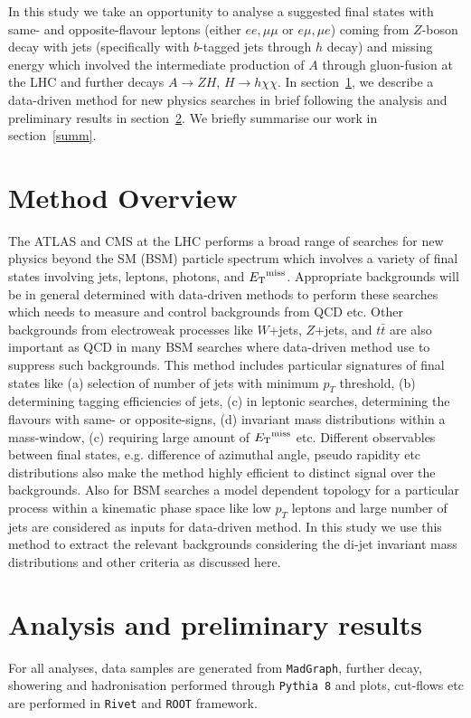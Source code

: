 \documentclass[a4paper]{jpconf}
\begin{document}
In this study we take an opportunity to analyse a suggested final states with same- and opposite-flavour leptons (either $ee, \mu\mu$
or $e\mu, \mu e$) coming from $Z$-boson decay with jets (specifically with $b$-tagged jets through $h$ decay) and missing energy 
which involved the intermediate production of $A$ through gluon-fusion at the LHC and further decays 
$A \to Z H$, $H \to h \chi\chi$. In section~\ref{method}, we describe a data-driven method for new physics searches in brief following
the analysis and preliminary results in section~\ref{analysis}. We briefly summarise our work in section~\ref{summ}. 

\section{Method Overview}
\label{method}
The ATLAS and CMS at the LHC performs a broad range of searches for new physics beyond the SM (BSM) particle spectrum which
involves a variety of final states involving jets, leptons, photons, and ${E_{\rm T}}^{\rm {miss}}$. Appropriate backgrounds will be in 
general determined with data-driven methods to perform these searches which needs to measure and control backgrounds from
QCD etc. Other backgrounds from electroweak processes like $W$+jets, $Z$+jets, and $t\bar t$ are also important as QCD 
in many BSM searches where data-driven method use to suppress such backgrounds. This method includes particular signatures of
final states like (a) selection of number of jets with minimum $p_T$ threshold, (b) determining tagging efficiencies of jets,
(c) in leptonic searches, determining the flavours with same- or opposite-signs, (d) invariant mass distributions within a mass-window,
(c) requiring large amount of ${E_{\rm T}}^{\rm {miss}}$ etc. Different observables between final states, e.g. difference of azimuthal
angle,  pseudo rapidity etc distributions also make the method highly efficient to distinct signal over the backgrounds. Also for BSM
searches a model dependent topology for a particular process within a kinematic phase space like low $p_T$ leptons and large 
number of jets are considered as inputs for data-driven method.
In this study we use this method to extract the relevant backgrounds considering the di-jet invariant mass distributions and other
criteria as discussed here.    
           
\section{Analysis and preliminary results}
\label{analysis}
For all analyses, data samples are generated from {\texttt{MadGraph}}, further decay, showering and hadronisation performed through
{\texttt{Pythia 8}} and plots, cut-flows etc are performed in {\texttt{Rivet}} and {\texttt{ROOT}} framework. 
\end{document}
